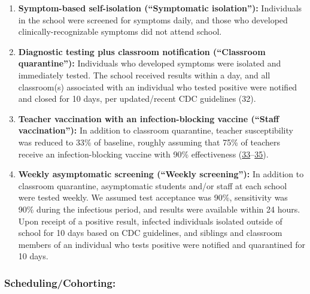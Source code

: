 \documentclass[
]{article}
\providecommand{\tightlist}{%
  \setlength{\itemsep}{0pt}\setlength{\parskip}{0pt}}
\begin{document}
\begin{enumerate}
\def\labelenumi{\arabic{enumi}.}
\tightlist
\item
  \textbf{Symptom-based self-isolation (“Symptomatic isolation”):}
  Individuals in the school were screened for symptoms daily, and those
  who developed clinically-recognizable symptoms did not attend school.
\item
  \textbf{Diagnostic testing plus classroom notification (“Classroom quarantine”):}
  Individuals who developed symptoms were isolated and immediately
  tested. The school received results within a day, and all classroom(s)
  associated with an individual who tested positive were notified and
  closed for 10 days, per updated/recent CDC guidelines (32).
\item
  \textbf{Teacher vaccination with an infection-blocking vaccine (“Staff vaccination”):}
  In addition to classroom quarantine, teacher susceptibility was
  reduced to 33\% of baseline, roughly assuming that 75\% of teachers
  receive an infection-blocking vaccine with 90\% effectiveness
  (\protect\hyperlink{ref-gallup_inc_willingness_2020}{33}--\protect\hyperlink{ref-polack_safety_2020}{35}).
\item
  \textbf{Weekly asymptomatic screening (“Weekly screening”):} In
  addition to classroom quarantine, asymptomatic students and/or staff
  at each school were tested weekly. We assumed test acceptance was
  90\%, sensitivity was 90\% during the infectious period, and results
  were available within 24 hours. Upon receipt of a positive result,
  infected individuals isolated outside of school for 10 days based on
  CDC guidelines, and siblings and classroom members of an individual
  who tests positive were notified and quarantined for 10 days.
\end{enumerate}

\medskip

\hypertarget{schedulingcohorting}{%
\subsubsection{Scheduling/Cohorting:}\label{schedulingcohorting}}
\end{document}
